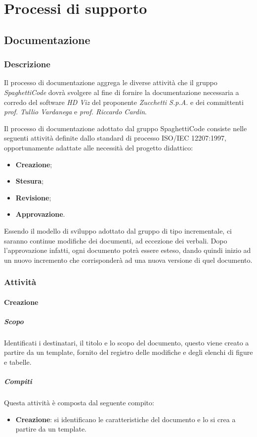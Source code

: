 \section{Processi di supporto}
\label{sec:processi_di_supporto}

\subsection{Documentazione}
\label{sub:doc}

\subsubsection{Descrizione}
\label{ssub:documentazione:descrizione}

Il processo di documentazione aggrega le diverse attività che il gruppo \emph{SpaghettiCode} dovrà svolgere al fine di fornire la documentazione necessaria a corredo del software \emph{HD Viz} del proponente \emph{Zucchetti S.p.A.} e dei committenti \emph{prof. Tullio Vardanega} e \emph{prof. Riccardo Cardin}.

Il processo di documentazione adottato dal gruppo SpaghettiCode consiste nelle seguenti attività definite dallo standard
di processo ISO/IEC 12207:1997, opportunamente adattate alle necessità del progetto didattico:
\begin{itemize}
    \item \textbf{Creazione};
    \item \textbf{Stesura};
    \item \textbf{Revisione};
    \item \textbf{Approvazione}.
\end{itemize}
Essendo il modello di sviluppo adottato dal gruppo di tipo incrementale, ci saranno continue modifiche dei documenti, ad eccezione dei verbali.
Dopo l'approvazione infatti, ogni documento potrà essere esteso, dando quindi inizio ad un nuovo incremento che corrisponderà ad una nuova versione di quel documento.

\subsubsection{Attività}
\label{ssub:documentazione:attivita}

\paragraph{Creazione}
\label{par:creazione}
\subparagraph{Scopo}
\label{par:creazione:scopo}
Identificati i destinatari, il titolo e lo scopo del documento, questo viene creato a partire da un template, fornito del registro delle modifiche e degli elenchi di figure e tabelle.
\subparagraph{Compiti}
\label{par:creazione:compiti}
Questa attività è composta dal seguente compito:
\begin{itemize}
    \item \textbf{Creazione}: si identificano le caratteristiche del documento e lo si crea a partire da un template.
\end{itemize}



